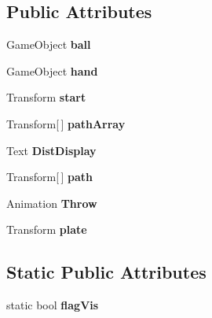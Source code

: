 \subsection*{Public Attributes}
\begin{DoxyCompactItemize}
\item 
Game\+Object {\bfseries ball}\hypertarget{class_ball_acad9ea662432b6ca6c5e64115950ac33}{}\label{class_ball_acad9ea662432b6ca6c5e64115950ac33}

\item 
Game\+Object {\bfseries hand}\hypertarget{class_ball_a65a5e30cf4fcda0dc4c9aebe888ef3fe}{}\label{class_ball_a65a5e30cf4fcda0dc4c9aebe888ef3fe}

\item 
Transform {\bfseries start}\hypertarget{class_ball_a7828590a1cbbfd75697ed72cf8f8cc25}{}\label{class_ball_a7828590a1cbbfd75697ed72cf8f8cc25}

\item 
Transform\mbox{[}$\,$\mbox{]} {\bfseries path\+Array}\hypertarget{class_ball_a60d5cb1763e8ef1e2931a95d0be72272}{}\label{class_ball_a60d5cb1763e8ef1e2931a95d0be72272}

\item 
Text {\bfseries Dist\+Display}\hypertarget{class_ball_ad1ae9770ce80db563a8c07483fb17c5d}{}\label{class_ball_ad1ae9770ce80db563a8c07483fb17c5d}

\item 
Transform\mbox{[}$\,$\mbox{]} {\bfseries path}\hypertarget{class_ball_a0767f4424644cb44aa5741e8e06d799b}{}\label{class_ball_a0767f4424644cb44aa5741e8e06d799b}

\item 
Animation {\bfseries Throw}\hypertarget{class_ball_a9e4d6879c0e6b04fa780e101ac82554f}{}\label{class_ball_a9e4d6879c0e6b04fa780e101ac82554f}

\item 
Transform {\bfseries plate}\hypertarget{class_ball_a2ac0453872bc1a5f81c620e1d8e0a669}{}\label{class_ball_a2ac0453872bc1a5f81c620e1d8e0a669}

\end{DoxyCompactItemize}
\subsection*{Static Public Attributes}
\begin{DoxyCompactItemize}
\item 
static bool {\bfseries flag\+Vis}\hypertarget{class_ball_a03f451731a1b4b6d656dfcac441a0d75}{}\label{class_ball_a03f451731a1b4b6d656dfcac441a0d75}

\end{DoxyCompactItemize}
